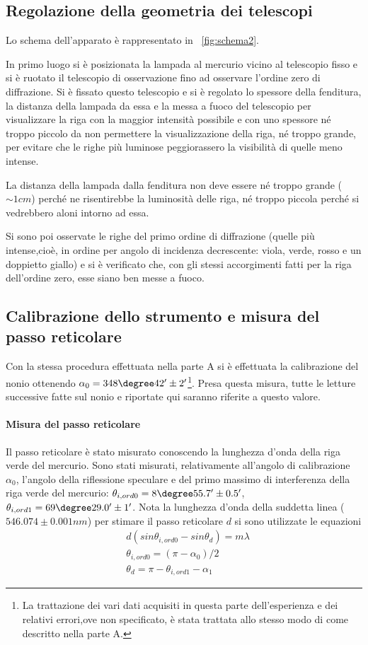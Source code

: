 \documentclass[a4paper,10pt]{article}
\begin{document}
{{{{{\subsection{Regolazione della geometria dei telescopi}
Lo schema dell'apparato è rappresentato in \figurename{~\ref{fig:schema2}}.

In primo luogo si è posizionata la lampada al mercurio vicino al telescopio fisso e si è ruotato il telescopio di osservazione fino ad osservare l'ordine zero di diffrazione. 
Si è fissato questo telescopio e si è regolato lo spessore della fenditura, la distanza della lampada da essa e la messa a fuoco del telescopio per visualizzare la riga con la maggior intensità possibile e con uno spessore né troppo piccolo da non permettere la visualizzazione della riga, né troppo grande, per evitare che le righe più luminose peggiorassero la visibilità di quelle meno intense.

La distanza della lampada dalla fenditura non deve essere né troppo grande ($\sim 1 cm$) perché ne risentirebbe la luminosità delle riga, né troppo piccola perché si vedrebbero aloni intorno ad essa.

Si sono poi osservate le righe del primo ordine di diffrazione (quelle più intense,cioè, in ordine per angolo di incidenza decrescente: viola, verde, rosso e un doppietto giallo) e si è verificato che, con gli stessi accorgimenti fatti per la riga dell'ordine zero, esse siano ben messe a fuoco.

\subsection{Calibrazione dello strumento e misura del passo reticolare}
Con la stessa procedura effettuata nella parte A si è effettuata la calibrazione del nonio ottenendo $\alpha_0 = 348\degree 42' \pm  2' $\footnote{La trattazione dei vari dati acquisiti in questa parte dell'esperienza e dei relativi errori,ove non specificato, è stata trattata allo stesso modo di come descritto nella parte A.}. Presa questa misura, tutte le letture successive fatte sul nonio e riportate qui saranno riferite a questo valore.


\paragraph{Misura del passo reticolare}
Il passo reticolare è stato misurato conoscendo la lunghezza d'onda della riga verde del mercurio. Sono stati misurati, relativamente all'angolo di calibrazione $\alpha_0$, l'angolo della riflessione speculare e del primo massimo di interferenza della riga verde del mercurio: $\theta_{i,ord0} = 8\degree 55.7' \pm 0.5'$, $\theta_{i,ord1} = 69\degree 29.0'\pm 1'$. Nota la lunghezza d'onda della suddetta linea ($546.074 \pm 0.001 nm$) per stimare il passo reticolare $d$ si sono utilizzate le equazioni
\begin{align*}
&d(sin \theta_{i,ord0} - sin \theta_d) = m\lambda\\
&\theta_{i,ord0} = (\pi - \alpha_0)/2\\
&\theta_d = \pi - \theta_{i,ord1} - \alpha_1
\end{align*}

}}}}}
\end{document}
